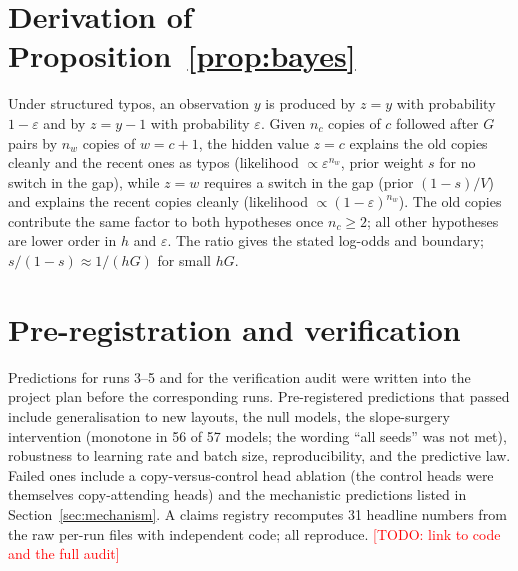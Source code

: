 \documentclass[11pt]{article}
\newcommand{\todo}[1]{\textcolor{red}{[TODO: #1]}}
\begin{document}



\appendix

\section{Derivation of Proposition~\ref{prop:bayes}}
Under structured typos, an observation $y$ is produced by $z = y$ with probability $1-\varepsilon$ and by $z = y - 1$ with probability $\varepsilon$. Given $n_c$ copies of $c$ followed after $G$ pairs by $n_w$ copies of $w = c+1$, the hidden value $z = c$ explains the old copies cleanly and the recent ones as typos (likelihood $\propto \varepsilon^{n_w}$, prior weight $s$ for no switch in the gap), while $z = w$ requires a switch in the gap (prior $(1-s)/V$) and explains the recent copies cleanly (likelihood $\propto (1-\varepsilon)^{n_w}$). The old copies contribute the same factor to both hypotheses once $n_c \ge 2$; all other hypotheses are lower order in $h$ and $\varepsilon$. The ratio gives the stated log-odds and boundary; $s/(1-s) \approx 1/(hG)$ for small $hG$.

\section{Pre-registration and verification}
Predictions for runs 3--5 and for the verification audit were written into the project plan before the corresponding runs. Pre-registered predictions that passed include generalisation to new layouts, the null models, the slope-surgery intervention (monotone in 56 of 57 models; the wording ``all seeds'' was not met), robustness to learning rate and batch size, reproducibility, and the predictive law. Failed ones include a copy-versus-control head ablation (the control heads were themselves copy-attending heads) and the mechanistic predictions listed in Section~\ref{sec:mechanism}. A claims registry recomputes 31 headline numbers from the raw per-run files with independent code; all reproduce. \todo{link to code and the full audit}
\end{document}
